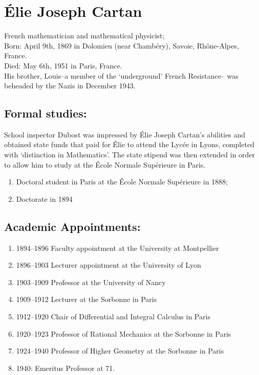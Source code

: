 \documentclass[12pt]{article}
\theoremstyle{plain}
\theoremstyle{definition}
\numberwithin{equation}{section}
\begin{document}
\section{\'{E}lie Joseph Cartan}
French mathematician and mathematical physicist;\\
Born: April 9th, 1869 in Dolomieu (near Chamb\'ery), Savoie, Rh\^{o}ne-Alpes, France.\\
Died: May 6th, 1951 in Paris, France.\\
His brother, Louis--a member of the `underground' French Resistance-- was beheaded by the Nazis in December 1943.

\subsection{Formal studies:}
\bigbreak
School inspector Dubost was impressed by \'{E}lie Joseph Cartan's abilities and obtained state funds that paid for 
\'{E}lie to attend the Lyc\'ee in Lyons, completed with `distinction in Mathematics'. 
The state stipend was then extended in order to allow him to study at the \'Ecole Normale Sup\'erieure in Paris. 

\begin{enumerate}
\item Doctoral student in Paris at the \'Ecole Normale Sup\'erieure in 1888;
\item Doctorate in 1894
\end{enumerate}

\subsection{Academic Appointments:} 

\begin{enumerate}
\item 1894--1896 Faculty appointment at the University at Montpellier
\item 1896--1903 Lecturer appointment at the University of Lyon
\item 1903--1909 Professor at the University of Nancy
\item 1909--1912 Lecturer at the Sorbonne in Paris
\item 1912--1920 Chair of Differential and Integral Calculus in Paris
\item 1920--1923 Professor of Rational Mechanics at the Sorbonne in Paris
\item 1924--1940 Professor of Higher Geometry at the Sorbonne in Paris
\item 1940:      Emeritus Professor at 71. 
\end{enumerate}
\end{document}
